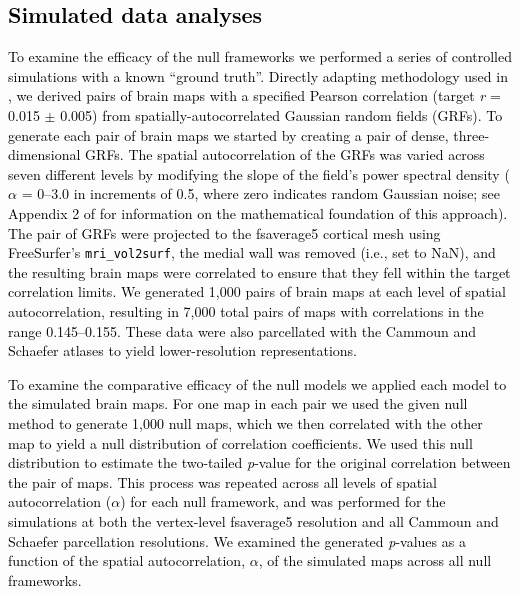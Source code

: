 \documentclass[12pt,aps,pra,reprint,showkeys]{revtex4-1}
\newcommand{\nimg}[1]{\textcolor{black}{{#1}}}
\begin{document}
\subsection*{\nimg{Simulated data analyses}}

\nimg{To examine the efficacy of the null frameworks we performed a series of controlled simulations with a known ``ground truth''.
Directly adapting methodology used in \citet{burt2020neuroimage}, we derived pairs of brain maps with a specified Pearson correlation (target \emph{r} = 0.015 $\pm$ 0.005) from spatially-autocorrelated Gaussian random fields (GRFs).
To generate each pair of brain maps we started by creating a pair of dense, three-dimensional GRFs.
The spatial autocorrelation of the GRFs was varied across seven different levels by modifying the slope of the field's power spectral density ($\alpha$ = 0--3.0 in increments of 0.5, where zero indicates random Gaussian noise; see Appendix 2 of \citet{burt2020neuroimage} for information on the mathematical foundation of this approach).
The pair of GRFs were projected to the fsaverage5 cortical mesh using FreeSurfer’s \texttt{mri\_vol2surf}, the medial wall was removed (i.e., set to NaN), and the resulting brain maps were correlated to ensure that they fell within the target correlation limits.
We generated 1,000 pairs of brain maps at each level of spatial autocorrelation, resulting in 7,000 total pairs of maps with correlations in the range 0.145--0.155.
These data were also parcellated with the Cammoun and Schaefer atlases to yield lower-resolution representations.}

\nimg{To examine the comparative efficacy of the null models we applied each model to the simulated brain maps.
For one map in each pair we used the given null method to generate 1,000 null maps, which we then correlated with the other map to yield a null distribution of correlation coefficients.
We used this null distribution to estimate the two-tailed \emph{p}-value for the original correlation between the pair of maps.
This process was repeated across all levels of spatial autocorrelation ($\alpha$) for each null framework, and was performed for the simulations at both the vertex-level fsaverage5 resolution and all Cammoun and Schaefer parcellation resolutions.
We examined the generated \emph{p}-values as a function of the spatial autocorrelation, $\alpha$, of the simulated maps across all null frameworks.}
\end{document}
